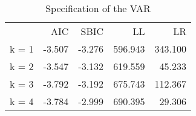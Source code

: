 \begin{table}[!h]
\caption{Specification of the VAR}
\centering
\begin{tabular}{lllll}
\cline{1-5}
\multicolumn{1}{c}{} &
  \multicolumn{1}{|r}{AIC} &
  \multicolumn{1}{r}{SBIC} &
  \multicolumn{1}{r}{LL} &
  \multicolumn{1}{r}{LR} \\
\cline{1-5}
\multicolumn{1}{l}{k = 1} &
  \multicolumn{1}{|r}{-3.507} &
  \multicolumn{1}{r}{-3.276} &
  \multicolumn{1}{r}{596.943} &
  \multicolumn{1}{r}{343.100} \\
\multicolumn{1}{l}{k = 2} &
  \multicolumn{1}{|r}{-3.547} &
  \multicolumn{1}{r}{-3.132} &
  \multicolumn{1}{r}{619.559} &
  \multicolumn{1}{r}{45.233} \\
\multicolumn{1}{l}{k = 3} &
  \multicolumn{1}{|r}{-3.792} &
  \multicolumn{1}{r}{-3.192} &
  \multicolumn{1}{r}{675.743} &
  \multicolumn{1}{r}{112.367} \\
\multicolumn{1}{l}{k = 4} &
  \multicolumn{1}{|r}{-3.784} &
  \multicolumn{1}{r}{-2.999} &
  \multicolumn{1}{r}{690.395} &
  \multicolumn{1}{r}{29.306} \\
\cline{1-5}
\end{tabular}
\end{table}

